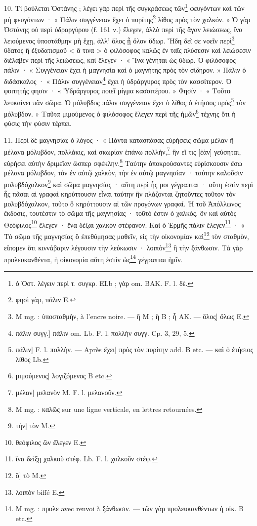 \documentclass[landscape, a4paper, 11pt, oneside, polutonikogreek, french]{article}
\begin{document}
10. Τί βούλεται Ὁστάνης ; λέγει γὰρ περὶ τῆς συγκράσεως τῶν\footnote{ὁ Ὁστ. λέγειν περὶ τ. συγκρ. ELb ; γὰρ om. BAK. F. l. δὲ.} φευγόντων καὶ τῶν μὴ φευγόντων · « Πάλιν συγγένειαν ἔχει ὁ πυρίτης\footnote{φησὶ γὰρ, πάλιν E.} λίθος πρὸς τὸν χαλκόν. » Ὁ γὰρ Ὁστάνης οὐ περὶ ὑδραργύρου (f. 161 v.) ἔλεγεν, ἀλλὰ περὶ τῆς ἄγαν λειώσεως, ἵνα λειούμενος ὑποστάθμην μὴ ἔχῃ, ἀλλ' ὅλος ᾖ ὅλον ὕδωρ. Ἤδη δεῖ σε νοεῖν περὶ\footnote{M mg. : ὑποσταθμὴν, à l'encre noire. --- ἢ M ; ἣ B ; ἦ AK. --- ὅλος] ὅλως E.} ὕδατος ἢ ἐξυδατισμοῦ < ἅ τινα > ὁ φιλόσοφος καλῶς ἐν ταῖς πλύσεσιν καὶ λειώσεσιν διέλαβεν περὶ τῆς λειώσεως, καὶ ἔλεγεν · « Ἵνα γένηται ὡς ὕδωρ. Ὁ φιλόσοφος πάλιν · « Συγγένειαν ἔχει ἡ μαγνησία καὶ ὁ μαγνήτης πρὸς τὸν σίδηρον. » Πάλιν ὁ διδάσκαλος · « Πάλιν συγγένειαν\footnote{πάλιν συγγ.] πάλιν om. Lb. F. l. πολλὴν συγγ. Cp. 3, 29, 5.} ἔχει ἡ ὑδράργυρος πρὸς τὸν κασσίτερον. Ὁ φοιτητής φησιν · « Ὑδράργυρος ποιεῖ μίγμα κασσιτέρου. » Φησίν · « Τοῦτο λευκαίνει πᾶν σῶμα. Ὁ μόλυβδος πάλιν συγγένειαν ἔχει ὁ λίθος ὁ ἐτήσιος πρὸς\footnote{πάλιν] F. l. πολλὴν. --- Après ἔχει] πρὸς τὸν πυρίτην add. B etc. --- καὶ ὁ ἐτήσιος λίθος Lb.} τὸν μόλυβδον. » Ταῦτα μιμούμενος ὁ φιλόσοφος ἔλεγεν περὶ τῆς ἡμῶν\footnote{μιμούμενος] λογιζόμενος B etc.} τέχνης ὅτι ἡ φύσις τὴν φύσιν τέρπει.

11. Περὶ δὲ μαγνησίας ὁ λόγος · « Πάντα κατασπάσας εὑρήσεις σῶμα μέλαν ἢ μέλανα μόλυβδον, πολλάκις, καὶ σκωρίαν ἐπάνω πολλὴν,\footnote{μέλαν] μελανὸν M. F. l. μελανοῦν.} ἣν εἴ τις [ἐὰν] γεύσηται, εὑρήσει αὐτὴν δριμεῖαν ὥσπερ σφέκλην.\footnote{M mg. : καλῶς sur une ligne verticale, en lettres retournées.} Ταύτην ἀποκρούσαντες εὑρίσκουσιν ἔσω μέλανα μόλυβδον, τὸν ἐν αὐτῷ χαλκὸν, τὴν ἐν αὐτῷ μαγνησίαν · ταύτην καλοῦσιν μολυβδόχαλκον\footnote{τὴν] τὸν M.} καὶ σῶμα μαγνησίας · αὕτη περὶ ἧς μοι γέγραπται · αὕτη ἐστὶν περὶ ἧς πᾶσαι αἱ γραφαὶ κηρύττουσιν εἶναι ταύτην ἣν πλάζονται ζητοῦντες τοῦτον τὸν μολυβδόχαλκον, τοῦτο ὃ κηρύττουσιν αἱ τῶν προγόνων γραφαί. Ἡ τοῦ Ἀπόλλωνος ἔκδοσις, τουτέστιν τὸ σῶμα τῆς μαγνησίας · τοῦτό ἐστιν ὁ χαλκὸς, ὃν καὶ αὐτὸς Θεόφιλος\footnote{θεόφιλος ὢν ἔλεγεν E.} ἔλεγεν · ἕνα δέξαι χαλκὸν στέφανον. Καὶ ὁ Ἐρμῆς πάλιν ἔλεγεν\footnote{ἵνα δείξῃ χαλκοῦ στέφ. Lb. F. l. χαλκοῦν στέφ.} · « Τὸ σῶμα τῆς μαγνησίας ὃ ἐπεθύμησας μαθεῖν, εἰς τὴν οἰκονομίαν καὶ\footnote{ὃ] τὸ M.} τὸν σταθμὸν, εἴπομεν ὅτι κιννάβαριν λέγουσιν τὴν λεύκωσιν · λοιπὸν\footnote{λοιπὸν biffé E.} ἢ τὴν ξάνθωσιν. Τὰ γὰρ προλευκανθέντα, ἡ οἰκονομία αὕτη ἐστὶν ὡς\footnote{M mg. : προλε avec renvoi à ξάνθωσιν. --- τῶν γὰρ προλευκανθέντων ἡ οἰκ. B etc.} γέγραπται ἡμῖν.
\end{document}
